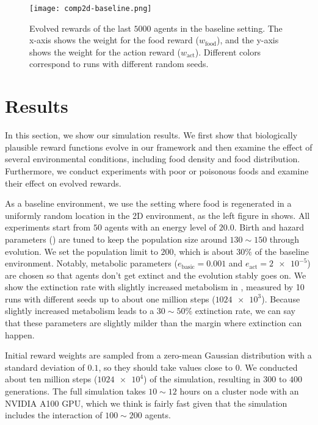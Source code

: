 \begin{figure}[t]
  \centering
  \texttt{[image: comp2d-baseline.png]}
  \caption{
    Evolved rewards of the last $5000$ agents in the baseline setting.
    The x-axis shows the weight for the food reward ($w_{\mathrm{food}}$), and the y-axis shows the weight for the action reward ($w_{\mathrm{act}}$).
    Different colors correspond to runs with different random seeds.
  }\label{figure:result-baseline}
\end{figure}

\section{Results}
In this section, we show our simulation results. We first show that biologically plausible reward functions evolve in our framework and then examine the effect of several environmental conditions, including food density and food distribution. Furthermore, we conduct experiments with poor or poisonous foods and examine their effect on evolved rewards.

As a baseline environment, we use the setting where food is regenerated in a uniformly random location in the 2D environment, as the left figure in  shows. All experiments start from $50$ agents with an energy level of $20.0$. Birth and hazard parameters () are tuned to keep the population size around $130\sim 150$ through evolution. We set the population limit to $200$, which is about $30\%$ of the baseline environment.  Notably, metabolic parameters ($e_{\mathrm{basic}} = 0.001$ and $e_{\mathrm{act}} = \num{2e-5}$) are chosen so that agents don't get extinct and the evolution stably goes on. We show the extinction rate with slightly increased metabolism in , measured by 10 runs with different seeds up to about one million steps ($\num{1024e3}$). Because slightly increased metabolism leads to a $30\sim50\%$ extinction rate, we can say that these parameters are slightly milder than the margin where extinction can happen.

Initial reward weights are sampled from a zero-mean Gaussian distribution with a standard deviation of $0.1$, so they should take values close to $0$. We conducted about ten million steps ($\num{1024e4}$) of the simulation, resulting in $300$ to $400$ generations. The full simulation takes $10\sim12$ hours on a cluster node with an NVIDIA A100 GPU, which we think is fairly fast given that the simulation includes the interaction of $100\sim200$ agents.

